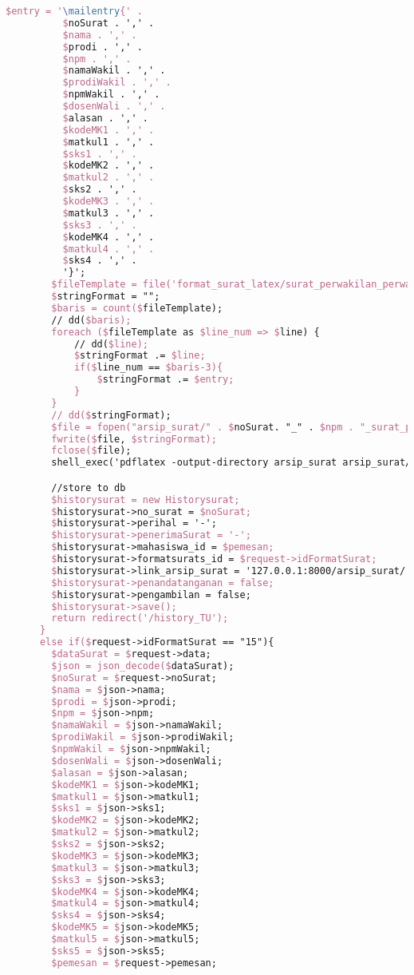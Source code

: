 \begin{lstlisting}[language=tex,basicstyle=\tiny,caption=HistorysuratController.php]
        $entry = '\mailentry{' .
          $noSurat . ',' .
          $nama . ',' .
          $prodi . ',' .
          $npm . ',' .
          $namaWakil . ',' .
          $prodiWakil . ',' .
          $npmWakil . ',' .
          $dosenWali . ',' .
          $alasan . ',' .
          $kodeMK1 . ',' .
          $matkul1 . ',' .
          $sks1 . ',' .
          $kodeMK2 . ',' .
          $matkul2 . ',' .
          $sks2 . ',' .
          $kodeMK3 . ',' .
          $matkul3 . ',' .
          $sks3 . ',' .
          $kodeMK4 . ',' .
          $matkul4 . ',' .
          $sks4 . ',' .
          '}';
        $fileTemplate = file('format_surat_latex/surat_perwakilan_perwalian_4mk.tex');
        $stringFormat = "";
        $baris = count($fileTemplate);
        // dd($baris);
        foreach ($fileTemplate as $line_num => $line) {
            // dd($line);
            $stringFormat .= $line;
            if($line_num == $baris-3){
                $stringFormat .= $entry;
            }
        }
        // dd($stringFormat);
        $file = fopen("arsip_surat/" . $noSurat. "_" . $npm . "_surat_perwakilan_perwalian_4mk.tex", "w");
        fwrite($file, $stringFormat);
        fclose($file);
        shell_exec('pdflatex -output-directory arsip_surat arsip_surat/' . $noSurat . '_' . $npm . '_surat_perwakilan_perwalian_4mk.tex');

        //store to db
        $historysurat = new Historysurat;
        $historysurat->no_surat = $noSurat;
        $historysurat->perihal = '-';
        $historysurat->penerimaSurat = '-';
        $historysurat->mahasiswa_id = $pemesan;
        $historysurat->formatsurats_id = $request->idFormatSurat;
        $historysurat->link_arsip_surat = '127.0.0.1:8000/arsip_surat/' . $noSurat. '_' . $npm . '_surat_perwakilan_perwalian_4mk.pdf';
        $historysurat->penandatanganan = false;
        $historysurat->pengambilan = false;
        $historysurat->save();
        return redirect('/history_TU');
      }
      else if($request->idFormatSurat == "15"){
        $dataSurat = $request->data;
        $json = json_decode($dataSurat);
        $noSurat = $request->noSurat;
        $nama = $json->nama;
        $prodi = $json->prodi;
        $npm = $json->npm;
        $namaWakil = $json->namaWakil;
        $prodiWakil = $json->prodiWakil;
        $npmWakil = $json->npmWakil;
        $dosenWali = $json->dosenWali;
        $alasan = $json->alasan;
        $kodeMK1 = $json->kodeMK1;
        $matkul1 = $json->matkul1;
        $sks1 = $json->sks1;
        $kodeMK2 = $json->kodeMK2;
        $matkul2 = $json->matkul2;
        $sks2 = $json->sks2;
        $kodeMK3 = $json->kodeMK3;
        $matkul3 = $json->matkul3;
        $sks3 = $json->sks3;
        $kodeMK4 = $json->kodeMK4;
        $matkul4 = $json->matkul4;
        $sks4 = $json->sks4;
        $kodeMK5 = $json->kodeMK5;
        $matkul5 = $json->matkul5;
        $sks5 = $json->sks5;
        $pemesan = $request->pemesan;


\end{lstlisting}
